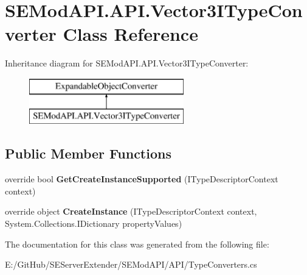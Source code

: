 \hypertarget{class_s_e_mod_a_p_i_1_1_a_p_i_1_1_vector3_i_type_converter}{}\section{S\+E\+Mod\+A\+P\+I.\+A\+P\+I.\+Vector3\+I\+Type\+Converter Class Reference}
\label{class_s_e_mod_a_p_i_1_1_a_p_i_1_1_vector3_i_type_converter}
Inheritance diagram for S\+E\+Mod\+A\+P\+I.\+A\+P\+I.\+Vector3\+I\+Type\+Converter\+:\begin{figure}[H]
\begin{center}
\leavevmode
\includegraphics[height=2.000000cm]{class_s_e_mod_a_p_i_1_1_a_p_i_1_1_vector3_i_type_converter}
\end{center}
\end{figure}
\subsection*{Public Member Functions}
\begin{DoxyCompactItemize}
\item 
\hypertarget{class_s_e_mod_a_p_i_1_1_a_p_i_1_1_vector3_i_type_converter_a59d303334fe1ba99117ef20261f4bd30}{}override bool {\bfseries Get\+Create\+Instance\+Supported} (I\+Type\+Descriptor\+Context context)\label{class_s_e_mod_a_p_i_1_1_a_p_i_1_1_vector3_i_type_converter_a59d303334fe1ba99117ef20261f4bd30}

\item 
\hypertarget{class_s_e_mod_a_p_i_1_1_a_p_i_1_1_vector3_i_type_converter_ae86b8a8810b0d8d4a52b63b0bf2f4691}{}override object {\bfseries Create\+Instance} (I\+Type\+Descriptor\+Context context, System.\+Collections.\+I\+Dictionary property\+Values)\label{class_s_e_mod_a_p_i_1_1_a_p_i_1_1_vector3_i_type_converter_ae86b8a8810b0d8d4a52b63b0bf2f4691}

\end{DoxyCompactItemize}


The documentation for this class was generated from the following file\+:\begin{DoxyCompactItemize}
\item 
E\+:/\+Git\+Hub/\+S\+E\+Server\+Extender/\+S\+E\+Mod\+A\+P\+I/\+A\+P\+I/Type\+Converters.\+cs\end{DoxyCompactItemize}
